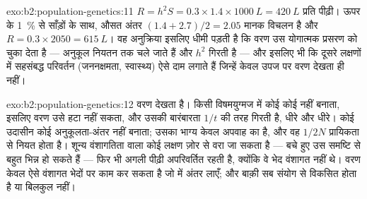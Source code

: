 \begin{solution}{exo:b2:population-genetics:11}
$R = h^{2}S = 0.3\times 1.4\times \qty{1000}{L} = \qty{420}{L}$ प्रति
पीढ़ी। ऊपर के \qty{1}{\%} से साँड़ों के साथ, औसत
अंतर $(1.4 + 2.7)/2 = 2.05$ मानक विचलन है और $R =
0.3\times 2050 = \qty{615}{L}$। वह अनुक्रिया इसलिए धीमी पड़ती है कि वरण
उस योगात्मक प्रसरण को चुका देता है --- अनुकूल  नियतन तक चले जाते हैं
और $h^{2}$ गिरती है --- और इसलिए भी कि दूसरे लक्षणों में सहसंबद्ध परिवर्तन
(जननक्षमता, स्वास्थ्य) ऐसे दाम लगाते हैं जिन्हें केवल उपज पर वरण
देखता ही नहीं।
\end{solution}

\begin{solution}{exo:b2:population-genetics:12}
वरण  देखता है। किसी विषमयुग्मज में कोई  
कोई  नहीं बनाता, इसलिए वरण उसे हटा नहीं सकता, और उसकी
बारंबारता $1/t$ की तरह गिरती है, धीरे और धीरे। कोई उदासीन 
कोई अनुकूलता-अंतर नहीं बनाता; उसका भाग्य केवल अपवाह का है, और वह
$1/2N$ प्रायिकता से नियत होता है। शून्य वंशागतिता वाला कोई लक्षण
ज़ोर से वरा जा सकता है --- बचे हुए उस समष्टि से बहुत भिन्न हो
सकते हैं --- फिर भी अगली पीढ़ी अपरिवर्तित रहती है, क्योंकि
वे भेद वंशागत नहीं थे। वरण केवल ऐसे वंशागत भेदों पर काम कर
सकता है जो  में अंतर लाएँ; और बाक़ी सब
संयोग से विकसित होता है या बिलकुल नहीं।
\end{solution}

